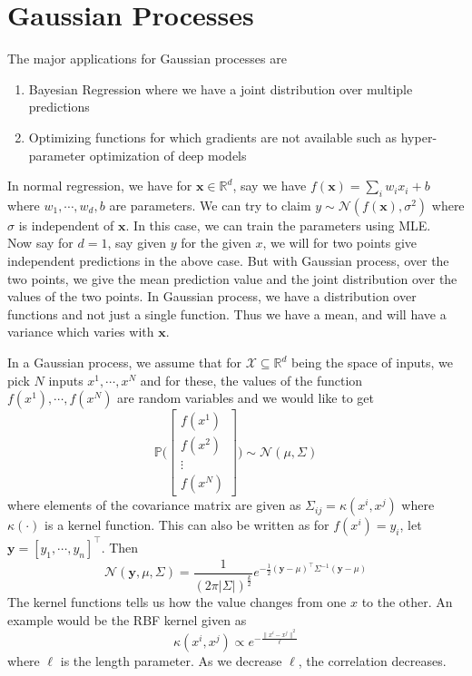 \section{Gaussian Processes}
The major applications for Gaussian processes are
\begin{enumerate}
	\item Bayesian Regression where we have a joint distribution over multiple predictions
	\item Optimizing functions for which gradients are not available such as hyper-parameter optimization of deep models
\end{enumerate}
In normal regression, we have for $\mathbf x \in \mathbb{R}^d$, say we have $f(\mathbf x) = \sum_i w_i x_i + b$ where $w_1, \cdots, w_d, b$ are parameters. We can try to claim $y \sim \mathcal{N}(f(\mathbf x), \sigma^2)$ where $\sigma$ is independent of $\mathbf x$. In this case, we can train the parameters using MLE. \\
Now say for $d = 1$, say given $y$ for the given $x$, we will for two points give independent predictions in the above case. But with Gaussian process, over the two points, we give the mean prediction value and the joint distribution over the values of the two points. In Gaussian process, we have a distribution over functions and not just a single function. Thus we have a mean, and will have a variance which varies with $\mathbf x$.
\begin{defn}
In a Gaussian process, we assume that for $\mathcal{X} \subseteq \mathbb{R}^d$ being the space of inputs, we pick $N$ inputs $x^1, \cdots, x^N$ and for these, the values of the function $f(x^1), \cdots, f(x^N)$ are random variables and we would like to get
\begin{equation}
\mathbb{P}\bigl(
\begin{bmatrix}
f(x^1) \\
f(x^2) \\
\vdots \\
f(x^N)
\end{bmatrix}
\bigr) \sim \mathcal{N}( \mu, \Sigma)
\end{equation}
where elements of the covariance matrix are given as $\Sigma_{ij} = \kappa(x^i, x^j)$ where $\kappa(\cdot)$ is a kernel function. This can also be written as for $f(x^i) = y_i$, let $\mathbf y = [y_1, \cdots, y_n]^\top$. Then
\begin{equation}
	\mathcal{N}(\mathbf y, \mu, \Sigma) = \dfrac{1}{(2\pi |\Sigma|)^{\frac{k}{2}}}e^{-\frac{1}{2}(\mathbf y - \mu)^\top \Sigma^{-1} (\mathbf y - \mu)}
\end{equation}
The kernel functions tells us how the value changes from one $x$ to the other. An example would be the RBF kernel given as
\begin{equation}
	\kappa(x^i, x^j) \propto e^{-\frac{\|x^i - x^j\|^2}{\ell}}
\end{equation}
where $\ell$ is the length parameter. As we decrease $\ell$, the correlation decreases.
\end{defn}
